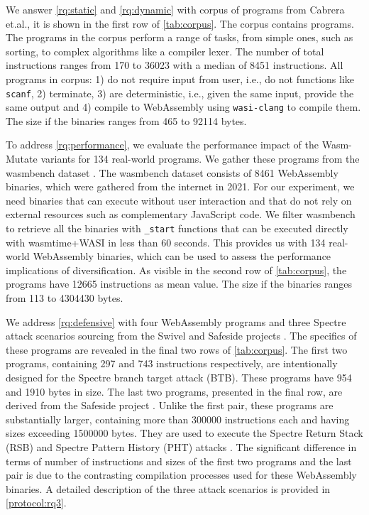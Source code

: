\documentclass[a4paper,fleqn]{cas-dc}
\newcommand{\tool}{{\sc Wasm-Mutate}\xspace}
\newcommand{\Wasm}{WebAssembly\xspace}
\newcommand{\wasm}{\Wasm}
\newcommand{\etal}{et.al.\xspace}
\newcommand{\ie}{i.e.,\xspace}
\newenvironment{revision1}{\color{blue}}{}
\begin{document}
We answer \ref{rq:static} and \ref{rq:dynamic} with corpus of programs from Cabrera \etal \cite{arteaga2020crow}, it is shown in the first row of \autoref{tab:corpus}.
The corpus contains \nProgramsRosetta programs.
The programs in the corpus perform a range of tasks, from simple ones, such as sorting, to complex algorithms like a compiler lexer. 
The number of total instructions ranges from 170 to 36023 with a median of 8451 instructions.
All programs in corpus: 
1) do not require input from user, \ie do not  functions like \texttt{scanf}, 2) terminate, 3) are deterministic, \ie given the same input, provide the same output and 4) compile to \wasm using \texttt{wasi-clang} to compile them.
The size if the binaries ranges from 465 to 92114 bytes. 

\begin{revision1}
To address \ref{rq:performance}, we evaluate the performance impact of the \tool variants for 134 real-world programs. 
We gather these programs from the wasmbench dataset \cite{hilbig2021empirical}. 
The wasmbench dataset consists of 8461 \Wasm binaries, which were gathered from the internet in 2021. 
For our experiment, we need binaries that can execute without user interaction and that do not rely on external resources such as complementary JavaScript code. 
We filter wasmbench to retrieve all the binaries with \texttt{_start} functions that can be executed directly with wasmtime+WASI in less than 60 seconds. 
This provides us with  134 real-world \Wasm binaries, which can be used to assess the performance implications of diversification. 
As visible in the second row of \autoref{tab:corpus}, the programs have 12665 instructions as mean value.
The size if the binaries ranges from 113 to 4304430 bytes. 
\end{revision1}

We address \ref{rq:defensive} with four \Wasm programs and three Spectre attack scenarios sourcing from the Swivel and Safeside projects \cite{Swivel,safeside}. 
The specifics of these programs are revealed in the final two rows of \autoref{tab:corpus}.
The first two programs, containing 297 and 743 instructions respectively, are intentionally designed for the Spectre branch target attack (BTB).
These programs have 954 and 1910 bytes in size. 
The last two programs, presented in the final row, are derived from the Safeside project \cite{safeside}. 
Unlike the first pair, these programs are substantially larger, containing more than 300000 instructions each and having sizes exceeding 1500000 bytes. 
They are used to execute the Spectre Return Stack (RSB) and Spectre Pattern History (PHT) attacks \cite{Spectre}. 
The significant difference in terms of number of instructions and sizes of the first two programs and the last pair is due to the contrasting compilation processes used for these \Wasm binaries. 
A detailed description of the three attack scenarios is provided in \autoref{protocol:rq3}.
\end{document}
